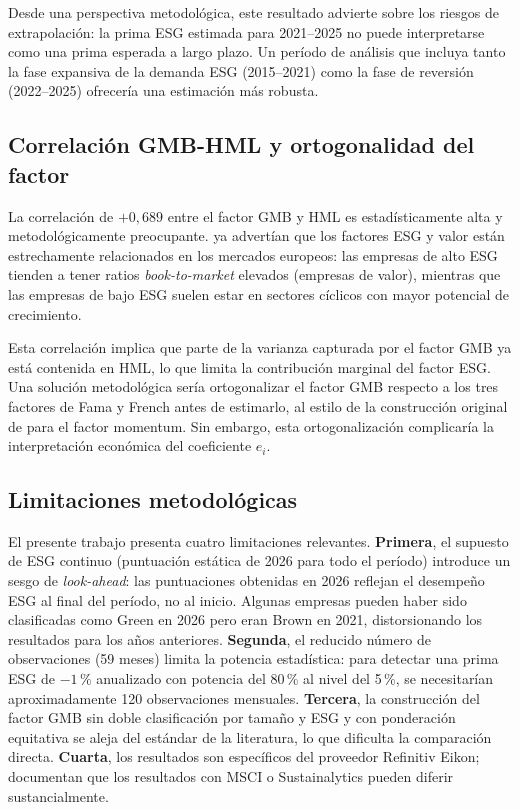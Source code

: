 \documentclass[12pt, a4paper]{article}
\begin{document}
Desde una perspectiva metodol\'ogica, este resultado advierte sobre los riesgos de
extrapolaci\'on: la prima ESG estimada para 2021--2025 no puede interpretarse como
una prima esperada a largo plazo. Un per\'iodo de an\'alisis que incluya tanto la fase
expansiva de la demanda ESG (2015--2021) como la fase de reversi\'on (2022--2025)
ofrecer\'ia una estimaci\'on m\'as robusta.

\subsection{Correlaci\'on GMB-HML y ortogonalidad del factor}
\label{subsec:correlacion_gmb}

La correlaci\'on de $+0{,}689$ entre el factor GMB y HML es estad\'isticamente alta
y metodol\'ogicamente preocupante. \textcite{lioui2022} ya advert\'ian que los factores
ESG y valor est\'an estrechamente relacionados en los mercados europeos: las empresas
de alto ESG tienden a tener ratios \textit{book-to-market} elevados (empresas de valor),
mientras que las empresas de bajo ESG suelen estar en sectores c\'iclicos con mayor
potencial de crecimiento.

Esta correlaci\'on implica que parte de la varianza capturada por el factor GMB ya
est\'a contenida en HML, lo que limita la contribuci\'on marginal del factor ESG.
Una soluci\'on metodol\'ogica ser\'ia ortogonalizar el factor GMB respecto a los
tres factores de Fama y French antes de estimarlo, al estilo de la construcci\'on
original de \textcite{carhart1997} para el factor momentum. Sin embargo, esta
ortogonalizaci\'on complicar\'ia la interpretaci\'on econ\'omica del coeficiente $e_i$.

\subsection{Limitaciones metodol\'ogicas}
\label{subsec:limitaciones}

El presente trabajo presenta cuatro limitaciones relevantes. \textbf{Primera}, el
supuesto de ESG continuo (puntuaci\'on est\'atica de 2026 para todo el per\'iodo)
introduce un sesgo de \textit{look-ahead}: las puntuaciones obtenidas en 2026 reflejan
el desempe\~no ESG al final del per\'iodo, no al inicio. Algunas empresas pueden haber
sido clasificadas como Green en 2026 pero eran Brown en 2021, distorsionando los
resultados para los a\~nos anteriores. \textbf{Segunda}, el reducido n\'umero de
observaciones (59 meses) limita la potencia estad\'istica: para detectar una prima
ESG de $-1\,\%$ anualizado con potencia del 80\,\% al nivel del 5\,\%, se necesitar\'ian
aproximadamente 120 observaciones mensuales. \textbf{Tercera}, la construcci\'on del
factor GMB sin doble clasificaci\'on por tama\~no y ESG y con ponderaci\'on equitativa
se aleja del est\'andar de la literatura, lo que dificulta la comparaci\'on directa.
\textbf{Cuarta}, los resultados son espec\'ificos del proveedor Refinitiv Eikon;
\textcite{bergkolbel2022} documentan que los resultados con MSCI o Sustainalytics
pueden diferir sustancialmente.
\end{document}
